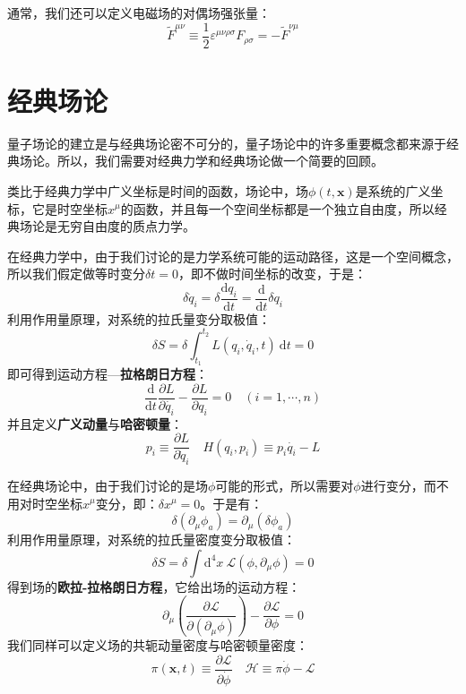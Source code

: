 \documentclass{book}
\begin{document}
通常，我们还可以定义电磁场的对偶场强张量：
\begin{equation}
	\widetilde{F}^{\mu\nu}\equiv\frac12\varepsilon^{\mu\nu\rho\sigma}F_{\rho\sigma}=-\widetilde{F}^{\nu\mu}
\end{equation}
\section{经典场论}
量子场论的建立是与经典场论密不可分的，量子场论中的许多重要概念都来源于经典场论。所以，我们需要对经典力学和经典场论做一个简要的回顾。

类比于经典力学中广义坐标是时间的函数，场论中，场$\phi(t,\mathbf{x})$是系统的广义坐标，它是时空坐标$x^\mu$的函数，并且每一个空间坐标都是一个独立自由度，所以经典场论是无穷自由度的质点力学。

在经典力学中，由于我们讨论的是力学系统可能的运动路径，这是一个空间概念，所以我们假定做等时变分$\delta t=0$，即不做时间坐标的改变，于是：
\begin{equation}
	\delta\dot{q}_i=\delta\frac{\mathrm{d}q_i}{\mathrm{d}t}=\frac{\mathrm{d}}{\mathrm{d}t}\delta q_i
\end{equation}
利用作用量原理，对系统的拉氏量变分取极值：
\begin{equation}
	\delta S=\delta\int_{t_1}^{t_2} L(q_i,\dot{q}_i,t)\ \mathrm{d}t=0
\end{equation}
即可得到运动方程—\textbf{拉格朗日方程}：
\begin{equation}
	\frac{\mathrm{d}}{\mathrm{d}t}\frac{\partial L}{\partial\dot{q_i}}-\frac{\partial L}{\partial q_i}=0\quad (i=1,\cdots,n)
\end{equation}
并且定义\textbf{广义动量}与\textbf{哈密顿量}：
\begin{equation}
	p_i\equiv\frac{\partial L}{\partial\dot{q}_i}\quad H(q_i,p_i)\equiv p_i\dot{q_i}-L
\end{equation}

在经典场论中，由于我们讨论的是场$\phi$可能的形式，所以需要对$\phi$进行变分，而不用对时空坐标$x^\mu$变分，即：$\delta x^\mu=0$。于是有：
\begin{equation}
	\delta(\partial_\mu\phi_a)=\partial_\mu(\delta\phi_a)
\end{equation}
利用作用量原理，对系统的拉氏量密度变分取极值：
\begin{equation}
	\delta S=\delta \int\mathrm{d}^4x \ \mathscr{L}(\phi,\partial_\mu\phi)=0
\end{equation}
得到场的\textbf{欧拉-拉格朗日方程}，它给出场的运动方程：
\begin{equation}
	\partial_{\mu}\left(\frac{\partial\mathscr{L}}{\partial(\partial_{\mu}\phi)}\right)-\frac{\partial\mathscr{L}}{\partial\phi}=0
\end{equation}
我们同样可以定义场的共轭动量密度与哈密顿量密度：
\begin{equation}
	\pi(\mathbf{x},t)\equiv\frac{\partial\mathscr{L}}{\partial \dot{\phi}}\quad \mathscr{H}\equiv\pi\dot{\phi}-\mathscr{L}
\end{equation}
\end{document}
